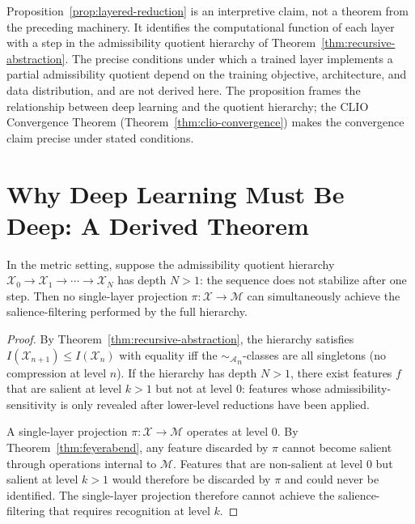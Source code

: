 \documentclass[12pt, a4paper, oneside]{book}
\newcommand{\Adm}{\mathcal{A}}
\newcommand{\X}{\mathcal{X}}
\newcommand{\M}{\mathcal{M}}
\newcommand{\proj}{\pi}
\newcommand{\SA}{{\sim_{\!\Adm}}}
\begin{document}
\begin{remark}
Proposition~\ref{prop:layered-reduction} is an interpretive claim, not
a theorem from the preceding machinery. It identifies the computational
function of each layer with a step in the admissibility quotient
hierarchy of Theorem~\ref{thm:recursive-abstraction}. The precise
conditions under which a trained layer implements a partial admissibility
quotient depend on the training objective, architecture, and data
distribution, and are not derived here. The proposition frames the
relationship between deep learning and the quotient hierarchy; the
CLIO Convergence Theorem (Theorem~\ref{thm:clio-convergence}) makes the
convergence claim precise under stated conditions.
\end{remark}

\section{Why Deep Learning Must Be Deep: A Derived Theorem}

\begin{theorem}
\label{thm:depth-necessary}
In the metric setting, suppose the admissibility quotient hierarchy
$\X_0 \to \X_1 \to \cdots \to \X_N$ has depth $N > 1$: the sequence
does not stabilize after one step.
Then no single-layer projection $\proj : \X \to \M$ can simultaneously
achieve the salience-filtering performed by the full hierarchy.
\end{theorem}

\begin{proof}
By Theorem~\ref{thm:recursive-abstraction}, the hierarchy satisfies
$I(\X_{n+1}) \leq I(\X_n)$ with equality iff the $\SA_n$-classes are
all singletons (no compression at level $n$). If the hierarchy has depth
$N > 1$, there exist features $f$ that are salient at level $k > 1$ but
not at level $0$: features whose admissibility-sensitivity is only
revealed after lower-level reductions have been applied.

A single-layer projection $\proj : \X \to \M$ operates at level $0$.
By Theorem~\ref{thm:feyerabend}, any feature discarded by $\proj$ cannot
become salient through operations internal to $\M$. Features that are
non-salient at level $0$ but salient at level $k > 1$ would therefore
be discarded by $\proj$ and could never be identified. The single-layer
projection therefore cannot achieve the salience-filtering that requires
recognition at level $k$.
\end{proof}
\end{document}
